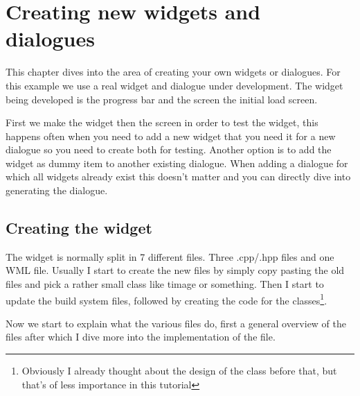 \chapter{Creating new widgets and dialogues}

This chapter dives into the area of creating your own widgets or dialogues. For
this example we use a real widget and dialogue under development. The widget
being developed is the progress bar and the screen the initial load screen.

First we make the widget then the screen in order to test the widget, this
happens often when you need to add a new widget that you need it for a new
dialogue so you need to create both for testing. Another option is to add the
widget as dummy item to another existing dialogue. When adding a dialogue for
which all widgets already exist this doesn't matter and you can directly dive
into generating the dialogue.

\section{Creating the widget}
\label{sec:creating_the_widget}

The widget is normally split in 7 different files. Three .cpp/.hpp files and one
WML file. Usually I start to create the new files by simply copy pasting the old
files and pick a rather small class like timage or something. Then I start to
update the build system files, followed by creating the code for the
classes\footnote{Obviously I already thought about the design of the class
before that, but that's of less importance in this tutorial}.

Now we start to explain what the various files do, first a general overview of
the files after which I dive more into the implementation of the file.

